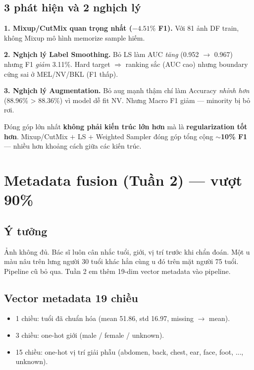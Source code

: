 \documentclass[11pt,a4paper]{article}
\begin{document}
\subsection{3 phát hiện và 2 nghịch lý}

\textbf{1. Mixup/CutMix quan trọng nhất ($-4.51\%$ F1).} Với 81 ảnh DF train, không Mixup mô hình memorize sample hiếm.

\textbf{2. Nghịch lý Label Smoothing.} Bỏ LS làm AUC \textit{tăng} (0.952 $\to$ 0.967) nhưng F1 \textit{giảm} 3.11\%. Hard target $\Rightarrow$ ranking sắc (AUC cao) nhưng boundary cứng sai ở MEL/NV/BKL (F1 thấp).

\textbf{3. Nghịch lý Augmentation.} Bỏ aug mạnh thậm chí làm Accuracy \textit{nhỉnh hơn} (88.96\% > 88.36\%) vì model dễ fit NV. Nhưng Macro F1 giảm --- minority bị bỏ rơi.

\begin{idea}
Đóng góp lớn nhất \textbf{không phải kiến trúc lớn hơn} mà là \textbf{regularization tốt hơn}. Mixup/CutMix $+$ LS $+$ Weighted Sampler đóng góp tổng cộng \textbf{$\sim$10\% F1} --- nhiều hơn khoảng cách giữa các kiến trúc.
\end{idea}

\section{Metadata fusion (Tuần 2) --- vượt 90\%}

\subsection{Ý tưởng}

\begin{simple}
Ảnh không đủ. Bác sĩ luôn cân nhắc tuổi, giới, vị trí trước khi chẩn đoán. Một u màu nâu trên lưng người 30 tuổi khác hẳn cùng u đó trên mặt người 75 tuổi. Pipeline cũ bỏ qua. Tuần 2 em thêm 19-dim vector metadata vào pipeline.
\end{simple}

\subsection{Vector metadata 19 chiều}

\begin{itemize}[leftmargin=*]
  \item 1 chiều: tuổi đã chuẩn hóa (mean 51.86, std 16.97, missing $\to$ mean).
  \item 3 chiều: one-hot giới (male / female / unknown).
  \item 15 chiều: one-hot vị trí giải phẫu (abdomen, back, chest, ear, face, foot, ..., unknown).
\end{itemize}
\end{document}
